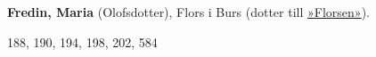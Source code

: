 \textbf{Fredin, Maria} (Olofsdotter), Flors i Burs (dotter till \href{Florsen}{»Florsen»}).

188, 190, 194, 198, 202, 584